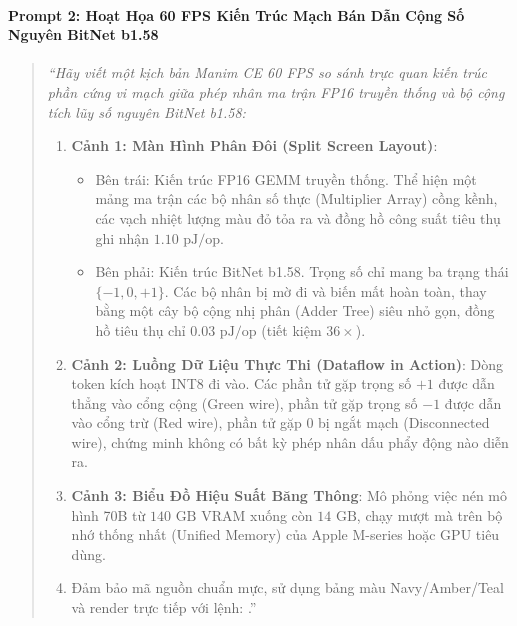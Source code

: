 \begin{simulationbox}
\paragraph{Prompt 2: Hoạt Họa 60 FPS Kiến Trúc Mạch Bán Dẫn Cộng Số Nguyên BitNet b1.58}
\begin{quote}\small\itshape
``Hãy viết một kịch bản Manim CE 60 FPS so sánh trực quan kiến trúc phần cứng vi mạch giữa phép nhân ma trận FP16 truyền thống và bộ cộng tích lũy số nguyên BitNet b1.58:
\begin{enumerate}
  \item \textbf{Cảnh 1: Màn Hình Phân Đôi (Split Screen Layout)}:
  \begin{itemize}
    \item Bên trái: Kiến trúc FP16 GEMM truyền thống. Thể hiện một mảng ma trận các bộ nhân số thực (Multiplier Array) cồng kềnh, các vạch nhiệt lượng màu đỏ tỏa ra và đồng hồ công suất tiêu thụ ghi nhận $1.10\text{ pJ/op}$.
    \item Bên phải: Kiến trúc BitNet b1.58. Trọng số chỉ mang ba trạng thái $\{-1, 0, +1\}$. Các bộ nhân bị mờ đi và biến mất hoàn toàn, thay bằng một cây bộ cộng nhị phân (Adder Tree) siêu nhỏ gọn, đồng hồ tiêu thụ chỉ $0.03\text{ pJ/op}$ (tiết kiệm $36\times$).
  \end{itemize}
  \item \textbf{Cảnh 2: Luồng Dữ Liệu Thực Thi (Dataflow in Action)}: Dòng token kích hoạt INT8 đi vào. Các phần tử gặp trọng số $+1$ được dẫn thẳng vào cổng cộng (Green wire), phần tử gặp trọng số $-1$ được dẫn vào cổng trừ (Red wire), phần tử gặp $0$ bị ngắt mạch (Disconnected wire), chứng minh không có bất kỳ phép nhân dấu phẩy động nào diễn ra.
  \item \textbf{Cảnh 3: Biểu Đồ Hiệu Suất Băng Thông}: Mô phỏng việc nén mô hình 70B từ $140\text{ GB}$ VRAM xuống còn $14\text{ GB}$, chạy mượt mà trên bộ nhớ thống nhất (Unified Memory) của Apple M-series hoặc GPU tiêu dùng.
  \item Đảm bảo mã nguồn chuẩn mực, sử dụng bảng màu Navy/Amber/Teal và render trực tiếp với lệnh: .''
\end{enumerate}
\end{quote}


\end{simulationbox}
